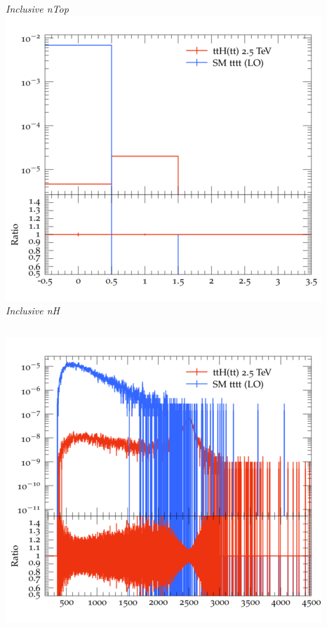 \documentclass{beamer}
\begin{document}
\begin{frame}
\begin{columns}
\textit{\small Inclusive nTop}
\includegraphics[width=\textwidth]{../plots/ttH_2500/tttt_ttH/Inclusive_nH.png}\\
\textit{\small Inclusive nH}
\end{columns}
\begin{columns}
\includegraphics[width=\textwidth]{../plots/ttH_2500/tttt_ttH/Inclusive_InvM_ttbar12.png}\\

\end{columns}
\end{frame}
\end{document}
